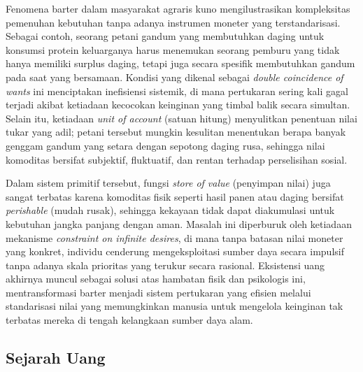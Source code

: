 \begin{example}
    Fenomena barter dalam masyarakat agraris kuno mengilustrasikan kompleksitas pemenuhan kebutuhan tanpa adanya instrumen moneter yang terstandarisasi. Sebagai contoh, seorang petani gandum yang membutuhkan daging untuk konsumsi protein keluarganya harus menemukan seorang pemburu yang tidak hanya memiliki surplus daging, tetapi juga secara spesifik membutuhkan gandum pada saat yang bersamaan. Kondisi yang dikenal sebagai \textit{double coincidence of wants} ini menciptakan inefisiensi sistemik, di mana pertukaran sering kali gagal terjadi akibat ketiadaan kecocokan keinginan yang timbal balik secara simultan. Selain itu, ketiadaan \textit{unit of account} (satuan hitung) menyulitkan penentuan nilai tukar yang adil; petani tersebut mungkin kesulitan menentukan berapa banyak genggam gandum yang setara dengan sepotong daging rusa, sehingga nilai komoditas bersifat subjektif, fluktuatif, dan rentan terhadap perselisihan sosial.

    Dalam sistem primitif tersebut, fungsi \textit{store of value} (penyimpan nilai) juga sangat terbatas karena komoditas fisik seperti hasil panen atau daging bersifat \textit{perishable} (mudah rusak), sehingga kekayaan tidak dapat diakumulasi untuk kebutuhan jangka panjang dengan aman. Masalah ini diperburuk oleh ketiadaan mekanisme \textit{constraint on infinite desires}, di mana tanpa batasan nilai moneter yang konkret, individu cenderung mengeksploitasi sumber daya secara impulsif tanpa adanya skala prioritas yang terukur secara rasional. Eksistensi uang akhirnya muncul sebagai solusi atas hambatan fisik dan psikologis ini, mentransformasi barter menjadi sistem pertukaran yang efisien melalui standarisasi nilai yang memungkinkan manusia untuk mengelola keinginan tak terbatas mereka di tengah kelangkaan sumber daya alam.
\end{example}

\subsection{Sejarah Uang}

